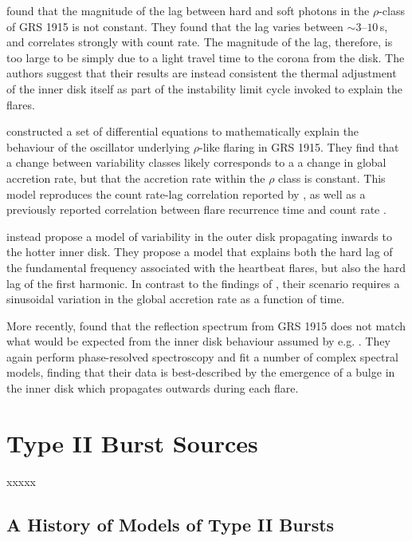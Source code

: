 \par \citealp{Massa_MoveLag} found that the magnitude of the lag between hard and soft photons in the $\rho$-class of GRS 1915 is not constant.  They found that the lag varies between $\sim3$--$10$\,s, and correlates strongly with count rate.  The magnitude of the lag, therefore, is too large to be simply due to a light travel time to the corona from the disk.  The authors suggest that their results are instead consistent the thermal adjustment of the inner disk itself as part of the instability limit cycle invoked to explain the flares.
\par \citealp{Massaro_Numerical} constructed a set of differential equations to mathematically explain the behaviour of the oscillator underlying $\rho$-like flaring in GRS 1915.  They find that a change between variability classes likely corresponds to a a change in global accretion rate, but that the accretion rate within the $\rho$ class is constant.  This model reproduces the count rate-lag correlation reported by \citealp{Massa_MoveLag}, as well as a previously reported correlation between flare recurrence time and count rate \citep{Massaro_Lag}.
\par \citealp{Mir_LagModel} instead propose a model of variability in the outer disk propagating inwards to the hotter inner disk.  They propose a model that explains both the hard lag of the fundamental frequency associated with the heartbeat flares, but also the hard lag of the first harmonic.  In contrast to the findings of \citealp{Massaro_Numerical}, their scenario requires a sinusoidal variation in the global accretion rate as a function of time.
\par More recently, \citealp{Zoghbi_Bulge} found that the reflection spectrum from GRS 1915 does not match what would be expected from the inner disk behaviour assumed by e.g. \citealp{Nayakshin_GRSModel}.  They again perform phase-resolved spectroscopy and fit a number of complex spectral models, finding that their data is best-described by the emergence of a bulge in the inner disk which propagates outwards during each flare.

\section{Type II Burst Sources}

xxxxx

\subsection{A History of Models of Type II Bursts}